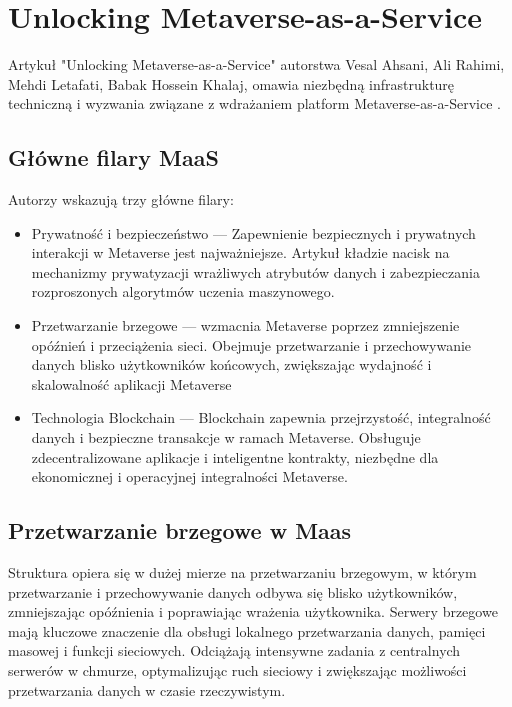 \section{Unlocking Metaverse-as-a-Service}

Artykuł "Unlocking Metaverse-as-a-Service" autorstwa Vesal Ahsani, Ali Rahimi, 
Mehdi Letafati, Babak Hossein Khalaj, omawia niezbędną infrastrukturę techniczną i wyzwania związane z wdrażaniem platform Metaverse-as-a-Service .

\subsection{Główne filary MaaS}

Autorzy wskazują trzy główne filary:
\begin{itemize}
    \item Prywatność i bezpieczeństwo --- Zapewnienie bezpiecznych i prywatnych interakcji w Metaverse jest najważniejsze. Artykuł kładzie nacisk na mechanizmy prywatyzacji wrażliwych atrybutów danych i zabezpieczania rozproszonych algorytmów uczenia maszynowego.
    \item Przetwarzanie brzegowe --- wzmacnia Metaverse poprzez zmniejszenie opóźnień i przeciążenia sieci. Obejmuje przetwarzanie i przechowywanie danych blisko użytkowników końcowych, zwiększając wydajność i skalowalność aplikacji Metaverse
    \item Technologia Blockchain --- Blockchain zapewnia przejrzystość, integralność danych i bezpieczne transakcje w ramach Metaverse. Obsługuje zdecentralizowane aplikacje i inteligentne kontrakty, niezbędne dla ekonomicznej i operacyjnej integralności Metaverse.
\end{itemize}

\subsection{Przetwarzanie brzegowe w Maas}

Struktura  opiera się w dużej mierze na przetwarzaniu brzegowym, w którym przetwarzanie i przechowywanie danych odbywa się blisko użytkowników, zmniejszając opóźnienia i poprawiając wrażenia użytkownika. Serwery brzegowe mają kluczowe znaczenie dla obsługi lokalnego przetwarzania danych, pamięci masowej i funkcji sieciowych. Odciążają intensywne zadania z centralnych serwerów w chmurze, optymalizując ruch sieciowy i zwiększając możliwości przetwarzania danych w czasie rzeczywistym.

